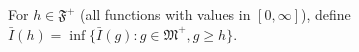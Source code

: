 For $h \in \mathfrak{F}^+$ (all functions with values in $[0, \infty]$), define $\bar{I}(h) = \inf\{\bar{I}(g) : g \in \mathfrak{M}^+, g \geq h\}$.
